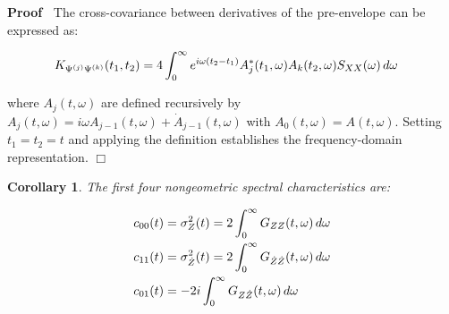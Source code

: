 \documentclass{article}
\newenvironment{proof}{\noindent\textbf{Proof\ }}{\hspace*{\fill}$\Box$\medskip}
\newtheorem{corollary}{Corollary}
\begin{document}
\begin{proof}
  The cross-covariance between derivatives of the pre-envelope can be
  expressed as:
  
  \begin{align}
    K_{\Psi^{(j)} \Psi^{(k)}} (t_1, t_2) & = 4 \int_0^{\infty} e^{i \omega
    (t_2 - t_1)} A_j^{\ast} (t_1, \omega) A_k (t_2, \omega) S_{XX} (\omega) 
    \hspace{0.17em} d \omega 
  \end{align}
  
  where $A_j (t, \omega)$ are defined recursively by $A_j (t, \omega) = i
  \omega A_{j - 1} (t, \omega) + \dot{A}_{j - 1} (t, \omega)$ with $A_0 (t,
  \omega) = A (t, \omega)$. Setting $t_1 = t_2 = t$ and applying the
  definition establishes the frequency-domain representation.
\end{proof}

\begin{corollary}
  The first four nongeometric spectral characteristics are:
  
  \begin{align}
    c_{00} (t) & = \sigma_Z^2 (t) = 2 \int_0^{\infty} G_{ZZ} (t, \omega) 
    \hspace{0.17em} d \omega \\
    c_{11} (t) & = \sigma_{\dot{Z}}^2 (t) = 2 \int_0^{\infty} G_{\dot{Z} 
    \dot{Z}} (t, \omega)  \hspace{0.17em} d \omega \\
    c_{01} (t) & = - 2 i \int_0^{\infty} G_{Z \dot{Z}} (t, \omega) 
    \hspace{0.17em} d \omega 
  \end{align}
\end{corollary}
\end{document}
